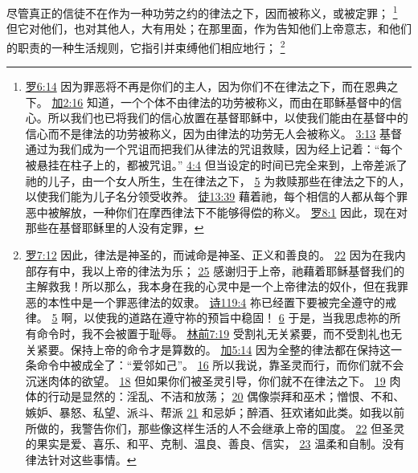 \documentclass[12pt, a4paper, oneside]{ctexart}
\newcounter{parnum}[section]
\newcommand{\N}{%
   \noindent\refstepcounter{parnum}%
    \makebox[\parindent][l]{\textbf{\arabic{parnum}.}}}
\begin{document}
\N 尽管真正的信徒不在作为一种功劳之约的律法之下，因而被称义，或被定罪；
	\footnote {
		\href{https://biblehub.com/romans/6-14.htm}{罗6:14} 因为罪恶将不再是你们的主人，因为你们不在律法之下，而在恩典之下。
		\href{https://biblehub.com/galatians/2-16.htm}{加2:16} 知道，一个个体不由律法的功劳被称义，而由在耶稣基督中的信心。所以我们也已将我们的信心放置在基督耶稣中，以使我们能由在基督中的信心而不是律法的功劳被称义，因为由律法的功劳无人会被称义。
		\href{https://biblehub.com/galatians/3-13.htm}{3:13} 基督通过为我们成为一个咒诅而把我们从律法的咒诅救赎，因为经上记着：“每个被悬挂在柱子上的，都被咒诅。”
		\href{https://biblehub.com/galatians/4-4.htm}{4:4} 但当设定的时间已完全来到，上帝差派了祂的儿子，由一个女人所生，生在律法之下，
		\href{https://biblehub.com/galatians/4-5.htm}{5} 为救赎那些在律法之下的人，以使我们能为儿子名分领受收养。
        \href{https://biblehub.com/acts/13-39.htm}{徒13:39} 藉着祂，每个相信的人都从每个罪恶中被解放，一种你们在摩西律法下不能够得偿的称义。
		\href{https://biblehub.com/romans/8-1.htm}{罗8:1} 因此，现在对那些在基督耶稣里的人没有定罪，
	}
	但它对他们，也对其他人，大有用处；在那里面，作为告知他们上帝意志，和他们的职责的一种生活规则，它指引并束缚他们相应地行；
	\footnote {
		\href{https://biblehub.com/romans/7-12.htm}{罗7:12} 因此，律法是神圣的，而诫命是神圣、正义和善良的。
        \href{https://biblehub.com/romans/7-22.htm}{22} 因为在我内部存有中，我以上帝的律法为乐；
		\href{https://biblehub.com/romans/7-25.htm}{25} 感谢归于上帝，祂藉着耶稣基督我们的主解救我！所以那么，我本身在我的心灵中是一个上帝律法的奴仆，但在我罪恶的本性中是一个罪恶律法的奴隶。
		\href{https://biblehub.com/psalms/119-4.htm}{诗119:4} 祢已经置下要被完全遵守的戒律。
		\href{https://biblehub.com/psalms/119-5.htm}{5} 啊，以使我的道路在遵守祢的预旨中稳固！
		\href{https://biblehub.com/psalms/119-6.htm}{6} 于是，当我思虑祢的所有命令时，我不会被置于耻辱。
		\href{https://biblehub.com/1_corinthians/7-19.htm}{林前7:19} 受割礼无关紧要，而不受割礼也无关紧要。保持上帝的命令才是算数的。
		\href{https://biblehub.com/galatians/5-14.htm}{加5:14} 因为全整的律法都在保持这一条命令中被成全了：“爱邻如己”。
		\href{https://biblehub.com/galatians/5-16.htm}{16} 所以我说，靠圣灵而行，而你们就不会沉迷肉体的欲望。
		\href{https://biblehub.com/galatians/5-18.htm}{18} 但如果你们被圣灵引导，你们就不在律法之下。
		\href{https://biblehub.com/galatians/5-19.htm}{19} 肉体的行动是显然的：淫乱、不洁和放荡；
		\href{https://biblehub.com/galatians/5-20.htm}{20} 偶像崇拜和巫术；憎恨、不和、嫉妒、暴怒、私望、派斗、帮派
		\href{https://biblehub.com/galatians/5-21.htm}{21} 和忌妒；醉酒、狂欢诸如此类。如我以前所做的，我警告你们，那些像这样生活的人不会继承上帝的国度。
		\href{https://biblehub.com/galatians/5-22.htm}{22} 但圣灵的果实是爱、喜乐、和平、克制、温良、善良、信实，
		\href{https://biblehub.com/galatians/5-23.htm}{23} 温柔和自制。没有律法针对这些事情。
	}
\end{document}
